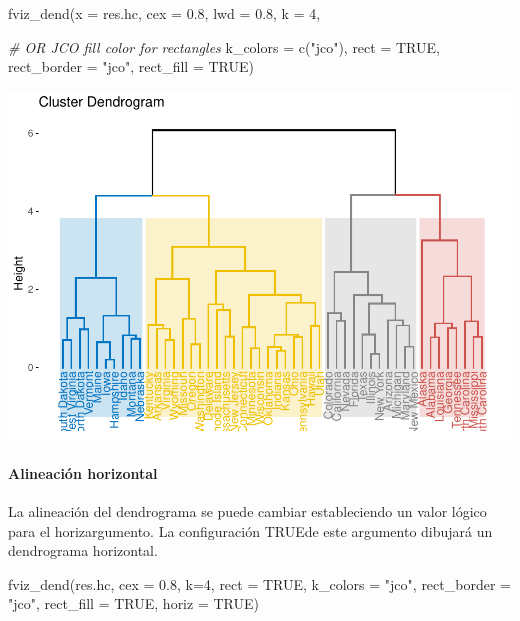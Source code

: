 \documentclass[
]{article}
\newenvironment{Shaded}{\begin{snugshade}}{\end{snugshade}}
\newcommand{\AttributeTok}[1]{\textcolor[rgb]{0.77,0.63,0.00}{#1}}
\newcommand{\CommentTok}[1]{\textcolor[rgb]{0.56,0.35,0.01}{\textit{#1}}}
\newcommand{\ConstantTok}[1]{\textcolor[rgb]{0.00,0.00,0.00}{#1}}
\newcommand{\DecValTok}[1]{\textcolor[rgb]{0.00,0.00,0.81}{#1}}
\newcommand{\FloatTok}[1]{\textcolor[rgb]{0.00,0.00,0.81}{#1}}
\newcommand{\FunctionTok}[1]{\textcolor[rgb]{0.00,0.00,0.00}{#1}}
\newcommand{\NormalTok}[1]{#1}
\newcommand{\StringTok}[1]{\textcolor[rgb]{0.31,0.60,0.02}{#1}}
\begin{document}
\begin{Shaded}
\begin{Highlighting}[]
\FunctionTok{fviz\_dend}\NormalTok{(}\AttributeTok{x =}\NormalTok{ res.hc, }\AttributeTok{cex =} \FloatTok{0.8}\NormalTok{, }\AttributeTok{lwd =} \FloatTok{0.8}\NormalTok{, }\AttributeTok{k =} \DecValTok{4}\NormalTok{,}
          

\CommentTok{\# OR JCO fill color for rectangles}
          \AttributeTok{k\_colors =} \FunctionTok{c}\NormalTok{(}\StringTok{"jco"}\NormalTok{),}
          \AttributeTok{rect =} \ConstantTok{TRUE}\NormalTok{, }
          \AttributeTok{rect\_border =} \StringTok{"jco"}\NormalTok{, }
          \AttributeTok{rect\_fill =} \ConstantTok{TRUE}\NormalTok{)}
\end{Highlighting}
\end{Shaded}

\includegraphics{clusterjerarquico1_files/figure-latex/unnamed-chunk-11-1.pdf}

\hypertarget{alineaciuxf3n-horizontal}{%
\paragraph{Alineación horizontal}\label{alineaciuxf3n-horizontal}}

La alineación del dendrograma se puede cambiar estableciendo un valor
lógico para el horizargumento. La configuración TRUEde este argumento
dibujará un dendrograma horizontal.

\begin{Shaded}
\begin{Highlighting}[]
\FunctionTok{fviz\_dend}\NormalTok{(res.hc, }\AttributeTok{cex =} \FloatTok{0.8}\NormalTok{, }\AttributeTok{k=}\DecValTok{4}\NormalTok{, }
          \AttributeTok{rect =} \ConstantTok{TRUE}\NormalTok{,  }
          \AttributeTok{k\_colors =} \StringTok{"jco"}\NormalTok{,}
          \AttributeTok{rect\_border =} \StringTok{"jco"}\NormalTok{, }
          \AttributeTok{rect\_fill =} \ConstantTok{TRUE}\NormalTok{, }
          \AttributeTok{horiz =} \ConstantTok{TRUE}\NormalTok{)}
\end{Highlighting}
\end{Shaded}
\end{document}
